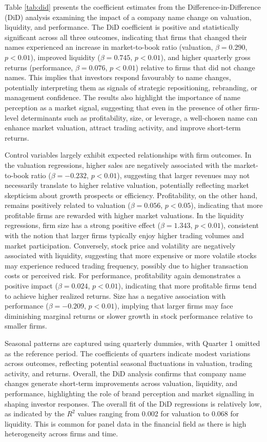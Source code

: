 \documentclass[a4paper,11pt]{report}
\begin{document}
Table \ref{tab:did} presents the coefficient estimates from the Difference-in-Difference (DiD) analysis examining the impact of a company name change on valuation, liquidity, and performance. The DiD coefficient is positive and statistically significant across all three outcomes, indicating that firms that changed their names experienced an increase in market-to-book ratio (valuation, $\beta = 0.290$, $p<0.01$), improved liquidity ($\beta = 0.745$, $p<0.01$), and higher quarterly gross returns (performance, $\beta = 0.076$, $p<0.01$) relative to firms that did not change names. This implies that investors respond favourably to name changes, potentially interpreting them as signals of strategic repositioning, rebranding, or management confidence. The results also highlight the importance of name perception as a market signal, suggesting that even in the presence of other firm-level determinants such as profitability, size, or leverage, a well-chosen name can enhance market valuation, attract trading activity, and improve short-term returns. 

Control variables largely exhibit expected relationships with firm outcomes. In the valuation regressions, higher sales are negatively associated with the market-to-book ratio ($\beta = -0.232$, $p<0.01$), suggesting that larger revenues may not necessarily translate to higher relative valuation, potentially reflecting market skepticism about growth prospects or efficiency. Profitability, on the other hand, remains positively related to valuation ($\beta = 0.056$, $p<0.05$), indicating that more profitable firms are rewarded with higher market valuations. In the liquidity regressions, firm size has a strong positive effect ($\beta = 1.343$, $p<0.01$), consistent with the notion that larger firms typically enjoy higher trading volumes and market participation. Conversely, stock price and volatility are negatively associated with liquidity, suggesting that more expensive or more volatile stocks may experience reduced trading frequency, possibly due to higher transaction costs or perceived risk. For performance, profitability again demonstrates a positive impact ($\beta = 0.024$, $p<0.01$), indicating that more profitable firms tend to achieve higher realized returns. Size has a negative association with performance ($\beta = -0.209$, $p<0.01$), implying that larger firms may face diminishing marginal returns or slower growth in stock performance relative to smaller firms.

Seasonal patterns are captured using quarterly dummies, with Quarter 1 omitted as the reference period. The coefficients of quarters indicate modest variations across outcomes, reflecting potential seasonal fluctuations in valuation, trading activity, and returns. Overall, the DiD analysis confirms that company name changes generate short-term improvements across valuation, liquidity, and performance, highlighting the role of brand perception and market signalling in shaping investor responses. The overall fit of the DiD regressions is relatively low, as indicated by the $R^2$ values ranging from 0.002 for valuation to 0.068 for liquidity. This is common for panel data in the financial field as there is high heterogeneity across firms and time.
\end{document}
